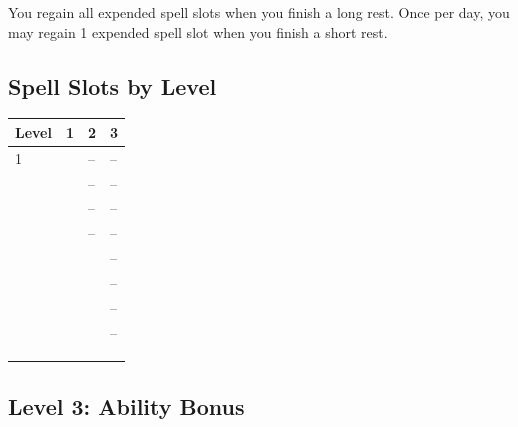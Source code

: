 \documentclass[12pt,letterpaper,twocolumn,openany,nodeprecatedcode,bg=none]{dndbook}
\let\oldsubsection\subsection
\renewcommand{\subsection}[1]{%
  \needspace{5\baselineskip}%
  \oldsubsection{#1}%
}
\begin{document}
You regain all expended spell slots when you finish a long rest. Once
per day, you may regain 1 expended spell slot when you finish a short
rest.

\subsection{Spell Slots by Level}\label{spell-slots-by-level}


{\def\LTcaptype{none} %
\begin{table}[!htbp]
\centering
\begin{tabular}{@{}
  >{\raggedright\arraybackslash}p{}
  >{\raggedright\arraybackslash}p{}
  >{\raggedright\arraybackslash}p{}
  >{\raggedright\arraybackslash}p{}@{}}
\toprule\noalign{}
\begin{minipage}[b]{\linewidth}\raggedright
Level
\end{minipage} & \begin{minipage}[b]{\linewidth}\raggedright
1
\end{minipage} & \begin{minipage}[b]{\linewidth}\raggedright
2
\end{minipage} & \begin{minipage}[b]{\linewidth}\raggedright
3
\end{minipage} \\
\midrule\noalign{}
1 & 2 & -- & -- \\
2 & 2 & -- & -- \\
3 & 3 & -- & -- \\
4 & 3 & -- & -- \\
5 & 4 & 2 & -- \\
6 & 4 & 2 & -- \\
7 & 4 & 3 & -- \\
8 & 4 & 3 & -- \\
9 & 4 & 3 & 2 \\
10 & 4 & 3 & 2 \\
\bottomrule\noalign{}
\end{tabular}
\end{table}
}

\subsection{Level 3: Ability Bonus}\label{level-3-ability-bonus}
\end{document}
